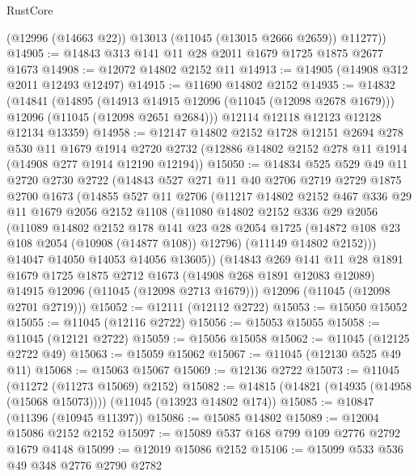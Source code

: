 \begin{lexlean}{RustCore}
\begin{coremodule}
        (@12996 (@14663 @22))
        @13013
        (@11045 (@13015 @2666 @2659))
        @11277))
@14905 := @14843 @313 @141 @11 @28 @2011 @1679 @1725 @1875 @2677 @1673
@14908 := @12072 @14802 @2152 @11
@14913 := @14905 (@14908 @312 @2011 @12493 @12497)
@14915 := @11690 @14802 @2152
@14935 := @14832
    (@14841
      (@14895
        (@14913 @14915 @12096 (@11045 (@12098 @2678 @1679)))
        @12096
        (@11045 (@12098 @2651 @2684)))
      @12114
      @12118
      @12123
      @12128
      @12134
      @13359)
@14958 := @12147
    @14802
    @2152
    @1728
    @12151
    @2694
    @278
    @530
    @11
    @1679
    @1914
    @2720
    @2732
    (@12886 @14802 @2152 @278 @11 @1914 (@14908 @277 @1914 @12190 @12194))
@15050 := @14834
    @525
    @529
    @49
    @11
    @2720
    @2730
    @2722
    (@14843
      @527
      @271
      @11
      @40
      @2706
      @2719
      @2729
      @1875
      @2700
      @1673
      (@14855
        @527
        @11
        @2706
        (@11217
          @14802
          @2152
          @467
          @336
          @29
          @11
          @1679
          @2056
          @2152
          @1108
          (@11080
            @14802
            @2152
            @336
            @29
            @2056
            (@11089
              @14802
              @2152
              @178
              @141
              @23
              @28
              @2054
              @1725
              (@14872 @108 @23 @108 @2054 (@10908 (@14877 @108)) @12796)
              (@11149 @14802 @2152)))
          @14047
          @14050
          @14053
          @14056
          @13605))
      (@14843
        @269
        @141
        @11
        @28
        @1891
        @1679
        @1725
        @1875
        @2712
        @1673
        (@14908 @268 @1891 @12083 @12089)
        @14915
        @12096
        (@11045 (@12098 @2713 @1679)))
      @12096
      (@11045 (@12098 @2701 @2719)))
@15052 := @12111 (@12112 @2722)
@15053 := @15050 @15052
@15055 := @11045 (@12116 @2722)
@15056 := @15053 @15055
@15058 := @11045 (@12121 @2722)
@15059 := @15056 @15058
@15062 := @11045 (@12125 @2722 @49)
@15063 := @15059 @15062
@15067 := @11045 (@12130 @525 @49 @11)
@15068 := @15063 @15067
@15069 := @12136 @2722
@15073 := @11045 (@11272 (@11273 @15069) @2152)
@15082 := @14815 (@14821 (@14935 (@14958 (@15068 @15073)))) (@11045 (@13923 @14802 @174))
@15085 := @10847 (@11396 (@10945 @11397))
@15086 := @15085 @14802
@15089 := @12004 @15086 @2152 @2152
@15097 := @15089 @537 @168 @799 @109 @2776 @2792 @1679 @4148
@15099 := @12019 @15086 @2152
@15106 := @15099 @533 @536 @49 @348 @2776 @2790 @2782

\end{coremodule}
\end{lexlean}
